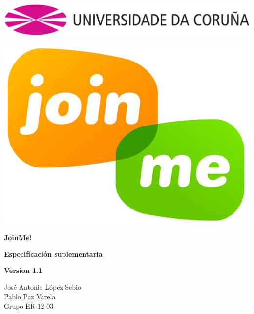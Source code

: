 \documentclass[12pt, a4paper, titlepage]{article}
\begin{document}

\begin{titlepage}

\includegraphics[width=15cm]{Imagenes/Simbolo_logo_UDC.png}

\vspace{3cm}

\begin{center}
	\includegraphics[scale=0.3]{Imagenes/1a_Practica_ER_14-15.png}
\end{center}

\begin{flushright}

	\LARGE{\textbf{JoinMe!}}
	
	\LARGE{\textbf{Especificación suplementaria}}
	
	\large{\textbf{Version 1.1}}
\end{flushright}
\vspace{1cm}
\begin{center}
	José Antonio López Sebio\\
	Pablo Paz Varela\\
	Grupo ER-12-03\\
\end{center}


\end{titlepage}
\end{document}
